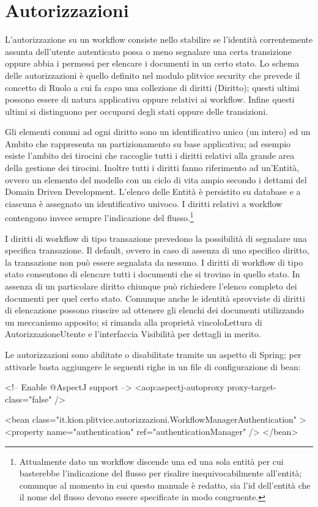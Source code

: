 \section{Autorizzazioni}

L'autorizzazione su un workflow consiste nello stabilire se l'identità correntemente assunta dell'utente autenticato possa o meno segnalare una certa transizione oppure abbia i permessi per elencare i documenti in un certo stato. Lo schema delle autorizzazioni è quello definito nel modulo plitvice security che prevede il concetto di Ruolo a cui fa capo una collezione di diritti (Diritto); questi ultimi possono essere di natura applicativa oppure relativi ai workflow. Infine questi ultimi si distinguono per occuparsi degli stati oppure delle transizioni.

Gli elementi comuni ad ogni diritto sono un identificativo unico (un intero) ed un Ambito che rappresenta un partizionamento su base applicativa; ad esempio esiste l'ambito dei tirocini che raccoglie tutti i diritti relativi alla grande area della gestione dei tirocini. Inoltre tutti i diritti fanno riferimento ad un'Entità, ovvero un elemento del modello con un ciclo di vita ampio secondo i dettami del Domain Driven Development. L'elenco delle Entità è persistito su database e a ciascuna è assegnato un identificativo univoco. I diritti relativi a workflow contengono invece sempre l'indicazione del flusso.\footnote{Attualmente dato un workflow discende una ed una sola entità per cui basterebbe l'indicazione del flusso per risalire inequivocabilmente all'entità; comunque al momento in cui questo manuale è redatto, sia l'id dell'entità che il nome del flusso devono essere specificate in modo congruente.}

I diritti di workflow di tipo transazione prevedono la possibilità di segnalare una specifica transazione. Il default, ovvero in caso di assenza di uno specifico diritto, la transazione non può essere segnalata da nessuno.
I diritti di workflow di tipo stato consentono di elencare tutti i documenti che si trovino in quello stato. In assenza di un particolare diritto chiunque può richiedere l'elenco completo dei documenti per quel certo stato. Comunque anche le identità sprovviste di diritti di elencazione possono riuscire ad ottenere gli elenchi dei documenti utilizzando un meccanismo apposito; si rimanda alla proprietà vincoloLettura di AutorizzazioneUtente e l'interfaccia Visibilità per dettagli in merito.

Le autorizzazioni sono abilitate o disabilitate tramite un aspetto di Spring; per attivarle  basta aggiungere le seguenti righe in un file di configurazione di bean:
\begin{xml}
<!-- Enable @AspectJ support -->
<aop:aspectj-autoproxy proxy-target-class="false" />
  
<bean class="it.kion.plitvice.autorizzazioni.WorkflowManagerAuthentication" >
   <property name="authentication" ref="authenticationManager" />
</bean>
\end{xml}

